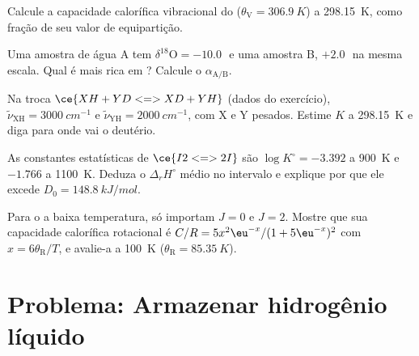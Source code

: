 \begin{exercise}[$\star\star$]\label{exo:b3:statistical-thermo-applied:8}
Calcule a capacidade calorífica vibracional do  ($\theta_{\mathrm V} = \qty{306.9}{K}$) a
\qty{298.15}{K}, como fração de seu valor de equipartição.
\end{exercise}

\begin{exercise}[$\star\star$]\label{exo:b3:statistical-thermo-applied:9}
Uma amostra de água A tem $\delta^{18}\mathrm O = -10.0$\,\textperthousand\ e uma amostra B,
$+2.0$\,\textperthousand\ na mesma escala. Qual é mais rica em ? Calcule o
 $\alpha_{\mathrm{A/B}}$.
\end{exercise}

\begin{exercise}[$\star\star\star$]\label{exo:b3:statistical-thermo-applied:10}
Na troca $\ce{XH + YD <=> XD + YH}$ (dados do exercício), $\tilde\nu_{\mathrm{XH}} =
\qty{3000}{cm^{-1}}$ e $\tilde\nu_{\mathrm{YH}} = \qty{2000}{cm^{-1}}$, com X e Y pesados. Estime $K$ a
\qty{298.15}{K} e diga para onde vai o deutério.
\end{exercise}

\begin{exercise}[$\star\star\star$]\label{exo:b3:statistical-thermo-applied:11}
As constantes estatísticas de $\ce{I2 <=> 2 I}$ são $\log K^\circ = -3.392$ a \qty{900}{K} e
$-1.766$ a \qty{1100}{K}. Deduza o $\Delta_rH^\circ$ médio no intervalo e explique
por que ele excede $D_0 = \qty{148.8}{kJ/mol}$.
\end{exercise}

\begin{exercise}[$\star\star\star$]\label{exo:b3:statistical-thermo-applied:12}
Para o  a baixa temperatura, só importam $J = 0$ e $J = 2$. Mostre que
sua capacidade calorífica rotacional é $C/R = 5x^2\eu^{-x}/(1 + 5\eu^{-x})^2$ com $x = 6\theta_{\mathrm R}/T$, e
avalie-a a \qty{100}{K} ($\theta_{\mathrm R} = \qty{85.35}{K}$).
\end{exercise}

\section{Problema: Armazenar hidrogênio líquido}


